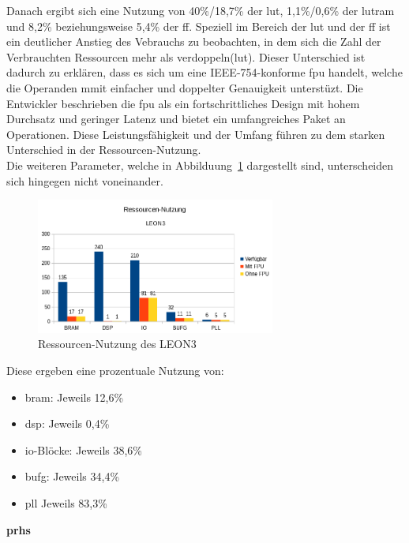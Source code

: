 Danach ergibt sich eine Nutzung von 40\%/18,7\% der \ac{lut}, 1,1\%/0,6\% der \ac{lutram} und 8,2\% beziehungsweise 5,4\% der \ac{ff}.
Speziell im Bereich der \ac{lut} und der \ac{ff} ist ein deutlicher Anstieg des Vebrauchs zu beobachten, in dem sich die Zahl der Verbrauchten Ressourcen mehr als verdoppeln(\ac{lut}).
Dieser Unterschied ist dadurch zu erklären, dass es sich um eine IEEE-754-konforme \ac{fpu} handelt, welche die Operanden mmit einfacher und doppelter Genauigkeit unterstüzt. Die Entwickler
beschrieben die \ac{fpu} als ein fortschrittliches Design mit hohem Durchsatz und geringer Latenz und bietet ein umfangreiches Paket an Operationen. Diese Leistungsfähigkeit und der Umfang
führen zu dem starken Unterschied in der Ressourcen-Nutzung.\\

Die weiteren Parameter, welche in Abbilduung~\ref{fig:ressourcenleon32} dargestellt sind, unterscheiden sich hingegen nicht voneinander.\\

\begin{figure}[H]
\centering
\includegraphics[width=0.7\textwidth]{Hauptteil/ressourcenleon32.png}
\caption{Ressourcen-Nutzung des LEON3}
\label{fig:ressourcenleon32}
\end{figure}

Diese ergeben eine prozentuale Nutzung von:\\
\begin{itemize}
  \item \ac{bram}: Jeweils 12,6\%
  \item \ac{dsp}: Jeweils 0,4\%
  \item \ac{io}-Blöcke: Jeweils 38,6\%
  \item \ac{bufg}: Jeweils 34,4\%
  \item \ac{pll} Jeweils 83,3\%
\end{itemize}


\textbf{\acl{prhs}}\\

